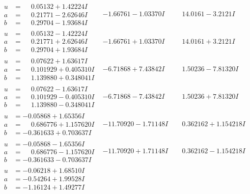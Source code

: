 \documentclass[1p]{elsarticle_modified}
\theoremstyle{definition}
\begin{document}
$$\begin{array}{c|c|c}
\begin{aligned}
u &= \phantom{-}0.05132 + 1.42224 I \\
a &= \phantom{-}0.21771 - 2.62646 I \\
b &= \phantom{-}0.29704 - 1.93684 I\end{aligned}
 & -1.66761 - 1.03370 I & \phantom{-}14.0161 - 3.2121 I \\ \hline\begin{aligned}
u &= \phantom{-}0.05132 - 1.42224 I \\
a &= \phantom{-}0.21771 + 2.62646 I \\
b &= \phantom{-}0.29704 + 1.93684 I\end{aligned}
 & -1.66761 + 1.03370 I & \phantom{-}14.0161 + 3.2121 I \\ \hline\begin{aligned}
u &= \phantom{-}0.07622 + 1.63617 I \\
a &= \phantom{-}0.101929 + 0.405310 I \\
b &= \phantom{-}1.139880 + 0.348041 I\end{aligned}
 & -6.71868 + 7.43842 I & \phantom{-}1.50236 - 7.81320 I \\ \hline\begin{aligned}
u &= \phantom{-}0.07622 - 1.63617 I \\
a &= \phantom{-}0.101929 - 0.405310 I \\
b &= \phantom{-}1.139880 - 0.348041 I\end{aligned}
 & -6.71868 - 7.43842 I & \phantom{-}1.50236 + 7.81320 I \\ \hline\begin{aligned}
u &= -0.05868 + 1.65356 I \\
a &= \phantom{-}0.686776 + 1.157620 I \\
b &= -0.361633 + 0.703637 I\end{aligned}
 & -11.70920 - 1.71148 I & \phantom{-}0.362162 + 1.154218 I \\ \hline\begin{aligned}
u &= -0.05868 - 1.65356 I \\
a &= \phantom{-}0.686776 - 1.157620 I \\
b &= -0.361633 - 0.703637 I\end{aligned}
 & -11.70920 + 1.71148 I & \phantom{-}0.362162 - 1.154218 I \\ \hline\begin{aligned}
u &= -0.06218 + 1.68510 I \\
a &= -0.54264 + 1.99528 I \\
b &= -1.16124 + 1.49277 I\end{aligned}

\end{array}$$
\end{document}
